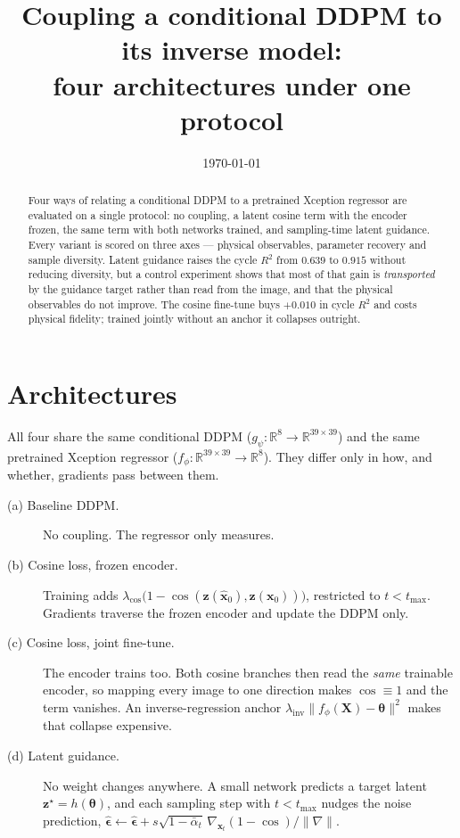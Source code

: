 \documentclass[11pt,a4paper]{article}
\title{Coupling a conditional DDPM to its inverse model:\\
       four architectures under one protocol}
\author{}
\date{\today}
\begin{document}
\maketitle

\begin{abstract}
Four ways of relating a conditional DDPM to a pretrained Xception regressor are
evaluated on a single protocol: no coupling, a latent cosine term with the encoder
frozen, the same term with both networks trained, and sampling-time latent guidance.
Every variant is scored on three axes --- physical observables, parameter recovery
and sample diversity. Latent guidance raises the cycle $R^{2}$ from $0.639$ to
$0.915$ without reducing diversity, but a control experiment shows that most of
that gain is \emph{transported} by the guidance target rather than read from the
image, and that the physical observables do not improve. The cosine fine-tune buys
$+0.010$ in cycle $R^{2}$ and costs physical fidelity; trained jointly without an
anchor it collapses outright.
\end{abstract}

\section{Architectures}

All four share the same conditional DDPM ($g_\psi:\mathbb{R}^{8}\!\to\!\mathbb{R}^{39\times39}$)
and the same pretrained Xception regressor ($f_\phi:\mathbb{R}^{39\times39}\!\to\!\mathbb{R}^{8}$).
They differ only in how, and whether, gradients pass between them.

\begin{description}
  \item[(a) Baseline DDPM.] No coupling. The regressor only measures.
  \item[(b) Cosine loss, frozen encoder.] Training adds
        $\lambda_{\cos}\bigl(1-\cos(\mathbf{z}(\hat{\mathbf{x}}_0),\mathbf{z}(\mathbf{x}_0))\bigr)$,
        restricted to $t<t_{\max}$. Gradients traverse the frozen encoder and update
        the DDPM only.
  \item[(c) Cosine loss, joint fine-tune.] The encoder trains too. Both cosine
        branches then read the \emph{same} trainable encoder, so mapping every image
        to one direction makes $\cos\equiv1$ and the term vanishes. An inverse-regression
        anchor $\lambda_{\mathrm{inv}}\lVert f_\phi(\mathbf{X})-\bm{\theta}\rVert^{2}$
        makes that collapse expensive.
  \item[(d) Latent guidance.] No weight changes anywhere. A small network predicts a
        target latent $\mathbf{z}^{\star}=h(\bm{\theta})$, and each sampling step with
        $t<t_{\max}$ nudges the noise prediction,
        $\hat{\bm\epsilon}\leftarrow\hat{\bm\epsilon}
         +s\sqrt{1-\bar\alpha_t}\,\nabla_{\mathbf{x}_t}(1-\cos)/\lVert\nabla\rVert$.
\end{description}
\end{document}
